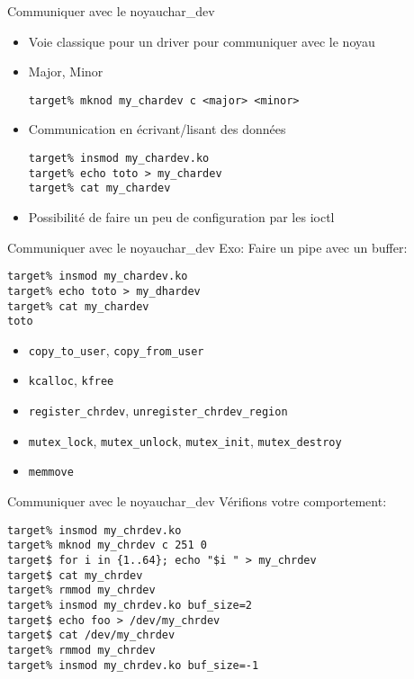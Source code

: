 \begin{frame}[fragile=singleslide]{Communiquer avec le noyau}{char\_dev}
  \begin{itemize}
  \item Voie classique pour un driver pour communiquer avec le noyau
  \item Major, Minor
    \begin{lstlisting}
target% mknod my_chardev c <major> <minor>
    \end{lstlisting}
  \item Communication en écrivant/lisant des données
    \begin{lstlisting}
target% insmod my_chardev.ko
target% echo toto > my_chardev
target% cat my_chardev
    \end{lstlisting}
  \item Possibilité de faire un peu de configuration par les ioctl
  \end{itemize}
\end{frame}

\begin{frame}[fragile=singleslide]{Communiquer avec le noyau}{char\_dev}
  Exo: Faire un pipe avec un buffer:
  \begin{lstlisting}
target% insmod my_chardev.ko
target% echo toto > my_dhardev
target% cat my_chardev
toto
  \end{lstlisting}
  \begin{itemize}
  \item \verb+copy_to_user+, \verb+copy_from_user+
  \item \verb+kcalloc+, \verb+kfree+
  \item \verb+register_chrdev+, \verb+unregister_chrdev_region+
  \item   \verb+mutex_lock+,  \verb+mutex_unlock+,  \verb+mutex_init+,
    \verb+mutex_destroy+
  \item \verb+memmove+
  \end{itemize}
\end{frame}

\begin{frame}[fragile=singleslide]{Communiquer avec le noyau}{char\_dev}
   Vérifions votre comportement:
   \begin{lstlisting}
target% insmod my_chrdev.ko
target% mknod my_chrdev c 251 0
target$ for i in {1..64}; echo "$i " > my_chrdev
target$ cat my_chrdev
target% rmmod my_chrdev
target% insmod my_chrdev.ko buf_size=2
target$ echo foo > /dev/my_chrdev
target$ cat /dev/my_chrdev
target% rmmod my_chrdev
target% insmod my_chrdev.ko buf_size=-1
    \end{lstlisting} %
\end{frame}
 
